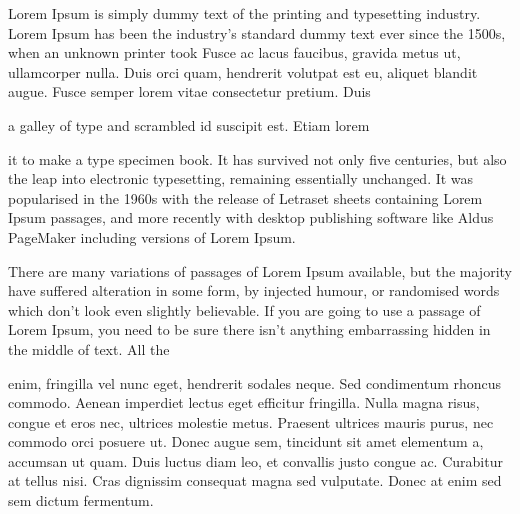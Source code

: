 \documentclass[11pt,letterpaper,openany]{scrbook}
\begin{document}
\begin{sloppypar}
		
\begin{paracol}{2}

\fontsize{11}{13}\leftfont Lorem Ipsum is simply dummy text of the printing and typesetting industry. Lorem Ipsum has been the industry's standard dummy text ever since the 1500s, when an unknown printer took \switchcolumn\fontsize{11}{13}\rightfont Fusce ac lacus faucibus, gravida metus ut, ullamcorper nulla. Duis orci quam, hendrerit volutpat est eu, aliquet blandit augue. Fusce semper lorem vitae consectetur pretium. Duis 

\end{paracol}


\begin{paracol}{3}

\fontsize{11}{13}\leftfont a galley of type and scrambled \switchcolumn[2]\fontsize{11}{13}\rightfont id suscipit est. Etiam lorem 

\end{paracol}

\begin{paracol}{3}\fontsize{11}{13}\leftfont it to make a type specimen book. It has survived not only five centuries, but also the leap into electronic typesetting, remaining essentially unchanged. It was popularised in the 1960s with the release of Letraset sheets containing Lorem Ipsum passages, and more recently with desktop publishing software like Aldus PageMaker including versions of Lorem Ipsum. 

\switchcolumn

\fontsize{13}{16}\centerfont There are many variations of passages of Lorem Ipsum available, but the majority have suffered alteration in some form, by injected humour, or randomised words which don't look even slightly believable. If you are going to use a passage of Lorem Ipsum, you need to be sure there isn't anything embarrassing hidden in the middle of text. All the 

\switchcolumn

\fontsize{11}{13}\rightfont enim, fringilla vel nunc eget, hendrerit sodales neque. Sed condimentum rhoncus commodo. Aenean imperdiet lectus eget efficitur fringilla. Nulla magna risus, congue et eros nec, ultrices molestie metus. Praesent ultrices mauris purus, nec commodo orci posuere ut. Donec augue sem, tincidunt sit amet elementum a, accumsan ut quam. Duis luctus diam leo, et convallis justo congue ac. Curabitur at tellus nisi. Cras dignissim consequat magna sed vulputate. Donec at enim sed sem dictum fermentum. 

\end{paracol}
			
\end{sloppypar}
\end{document}
